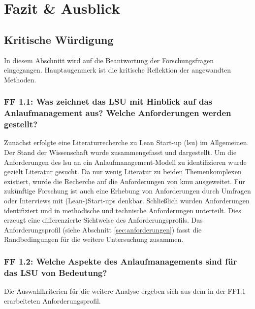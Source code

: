 \chapter{Fazit \& Ausblick}\label{sec:fazit}

\section{Kritische Würdigung}

In diesem Abschnitt wird auf die Beantwortung der Forschungsfragen eingegangen. Hauptaugenmerk ist die kritische Reflektion der angewandten Methoden. 

\subsection*{FF 1.1: Was zeichnet das LSU mit Hinblick auf das Anlaufmanagement aus? Welche Anforderungen werden gestellt?}
Zunächst erfolgte eine Literaturrecherche zu Lean Start-up (\gls{lsu}) im Allgemeinen. Der Stand der Wissenschaft wurde zusammengefasst und dargestellt. Um die Anforderungen des \gls{lsu} an ein Anlaufmanagement-Modell zu identifizieren wurde gezielt Literatur gesucht. Da nur wenig Literatur zu beiden Themenkomplexen existiert, wurde die Recherche auf die Anforderungen von \gls{kmu} ausgeweitet. Für zukünftige Forschung ist auch eine Erhebung von Anforderungen durch Umfragen oder Interviews mit (Lean-)Start-ups denkbar. Schließlich wurden Anforderungen identifiziert und in methodische und technische Anforderungen unterteilt. Dies erzeugt eine differenzierte Sichtweise des Anforderungsprofils. Das Anforderungsprofil (siehe Abschnitt \ref{sec:anforderungen}) fasst die Randbedingungen für die weitere Untersuchung zusammen. 

\subsection*{FF 1.2: Welche Aspekte des Anlaufmanagements sind für das LSU von Bedeutung?}
Die Auswahlkriterien für die weitere Analyse ergeben sich aus dem in der FF1.1 erarbeiteten Anforderungsprofil. 

